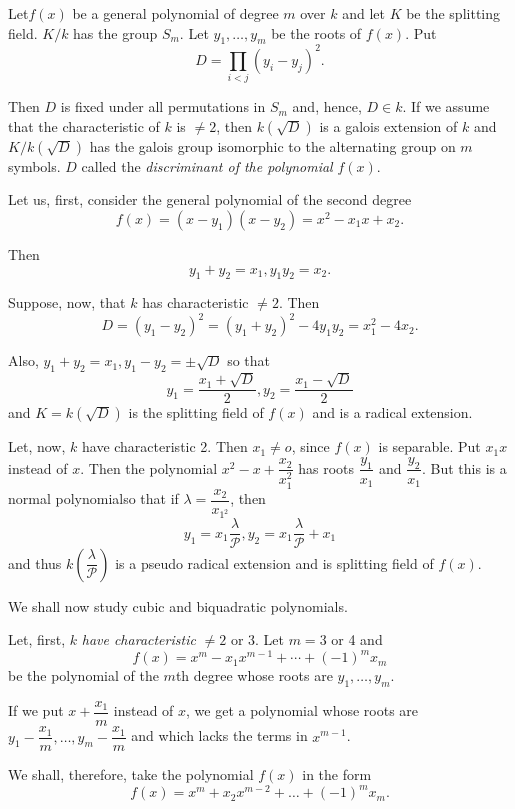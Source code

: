 Let\pageoriginale $f(x)$ be a general polynomial of degree $m$ over
$k$ and let $K$ be the splitting field. $K/k$ has the group $S_m$. Let
$y_1, \ldots , y_m$ be the roots of $f(x)$. Put 
 $$
 D= \prod_{i < j} (y_i- y_j)^2.
 $$
 
 Then $D$ is fixed under all permutations in $S_m$ and, hence, $D \in
 k$. If we assume that the characteristic of $k$ is $\neq 2$, then
 $k(\sqrt{D})$ is a galois extension of $k$ and $K/k(\sqrt{D})$ has
 the galois group isomorphic to the alternating  group on $m$
 symbols. $D$ called the \textit{discriminant of the polynomial}
 $f(x)$. 
 
 Let us, first, consider the general polynomial of the second degree
 $$
 f(x) = (x-y_1) (x-y_2)= x^2- x_1 x+x_2.
 $$ 
 
 Then  
 $$
 y_1  +y_2 =x_1, y_1 y_2 =x_2.
 $$
 
 Suppose, now, that $k$ has characteristic $\neq 2$. Then  
 $$
 D= (y_1-y_2)^2 = (y_1+y_2)^2 -4y_1y_2=x^2_1-4x_2.
 $$
 
 Also, $y_1 +y_2 = x_1, y_1-y_2= \pm \sqrt{D}$ so that  
 $$
 y_1= \frac{x_1+ \sqrt{D}}{2},{y_2}= \frac{x_1-\sqrt{D}}{2} 
 $$
 and $K=k(\sqrt{D})$ is the splitting  field of $f(x)$ and is a
 radical extension. 
 
 Let, now, $k$ have characteristic 2. Then $x_1 \neq o$, since $f(x)$
 is separable. Put $x_1x$ instead  of $x$. Then  the polynomial $x^2-
 x+  \dfrac{x_2}{x^2_1}$ has roots $\dfrac{y_1}{x_1}$ and
 $\dfrac{y_2}{x_1}$. But this is a normal polynomial\pageoriginale so
 that if  $\lambda = \dfrac{x_2}{x_{1^2}}$, then   
 $$
 y_1 = x_1 \frac{\lambda} {\mathscr{P}}, y_2 =x_1
 \frac{\lambda}{\mathscr{P}}+x_1 
 $$
 and thus $k(\dfrac{\lambda}{\mathscr{P}})$ is a pseudo radical
 extension and is splitting field of $f(x)$. 
 
 We shall now study cubic and biquadratic polynomials.
 
 Let, first, $k$ \textit{have characteristic} $\neq 2$ or 3. Let
 $m=3$ or 4 and  
 $$
 f(x)= x^m - x_1 x^{m-1} + \cdots + (-1)^m x_m
 $$
 be the polynomial of the $m$th degree whose roots are $y_1, \ldots,
 y_m$. 
 
 If we put $x+  \dfrac{x_1}{m}$ instead of $x$, we get a polynomial
 whose roots are $y_1- \dfrac{x_1}{m}, \ldots , y_m- \dfrac{x_1}{m}$
 and which lacks the terms in $x^{m-1}$. 
 
 We shall, therefore, take the polynomial $f(x)$ in the form  
 $$
 f(x) =x^m + x_2 x^{m-2}+ \ldots + (-1)^m  x_m.
 $$
 
